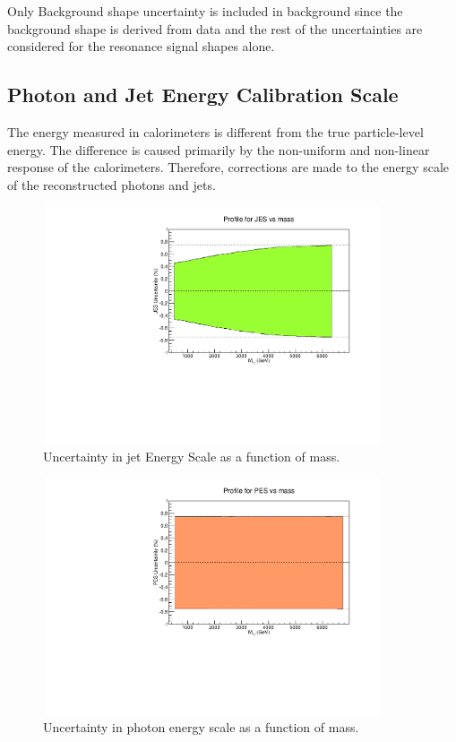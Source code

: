 Only Background shape uncertainty is included in background since the background shape is derived from data and the rest of the uncertainties are 
considered for the resonance signal shapes alone.

\subsection{Photon and Jet Energy Calibration Scale}
The energy measured in calorimeters is different from the true particle-level energy. The difference is caused primarily by the non-uniform and 
non-linear response of the calorimeters. %
Therefore, corrections are made to the energy scale of the reconstructed photons and jets. 
\begin{figure}[h!]
\centering
 \includegraphics[width=10cm,height=7cm]{ch5/plots/Systematics/JES_Sys.pdf}
 \caption{Uncertainty in jet Energy Scale as a function of mass.}
 \label{fig:JESsys}
\end{figure}
\begin{figure}[h!]
\centering
 \includegraphics[width=10cm,height=7cm]{ch5/plots/Systematics/PES_Sys.pdf}
 \caption{Uncertainty in photon energy scale as a function of mass.}
 \label{fig:PESsys}
\end{figure}

